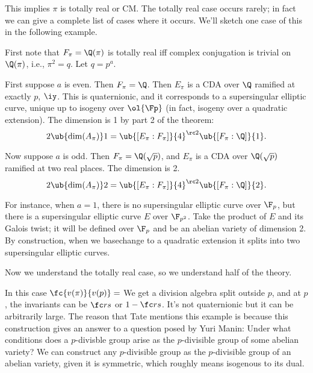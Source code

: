 This implies $\pi$ is totally real or CM. The totally real case occurs rarely; in fact we can give a complete list of cases where it occurs. We'll sketch one case of this in the following example.
\begin{ex}
First note that $F_{\pi}=\Q(\pi)$ is totally real iff complex conjugation is trivial on $\Q(\pi)$, i.e., $\pi^2=q$. Let $q=p^a$.

First suppose $a$ is even. Then $F_{\pi}=\Q$. %
Then $E_{\pi}$ is a CDA over $\Q$ ramified at exactly $p$, $\iy$. This is quaternionic, and it corresponds to a supersingular elliptic curve, unique up to isogeny over $\ol{\Fp}$ (in fact, isogeny over a quadratic extension). The dimension is 1 by part 2 of the theorem: %
\[
2\ub{\dim(A_{\pi})}1={\ub{[E_{\pi}:F_{\pi}]}{4}}^{\rc2}\ub{[F_{\pi}:\Q]}{1}.
\]

Now suppose $a$ is odd. %
Then $F_{\pi}=\Q(\sqrt p)$, and $E_{\pi}$ is a CDA over $\Q(\sqrt{p})$ ramified at two real places. 
The dimension is 2.
\[
2\ub{\dim(A_{\pi})}2={\ub{[E_{\pi}:F_{\pi}]}{4}}^{\rc2}\ub{[F_{\pi}:\Q]}{2}.
\]

For instance, when $a=1$, there is no supersingular elliptic curve over $\F_p$, but there is a supersingular elliptic curve $E$ over $\F_{p^2}$. Take the product of $E$ and its Galois twist; it will be defined over $\F_p$ and be an abelian variety of dimension 2. By construction, when we basechange to a quadratic extension it splits into two supersingular elliptic curves.
\end{ex}
Now we understand the totally real case, so we understand half of the theory.\\

\vskip0.15in

In this case $\fc{v(\pi)}{v(p)}=$ We get a division algebra split outside $p$, and at $p$, the invariants can be $\fc rs$ or $1-\fc rs$. It's not quaternionic but it can be arbitrarily large. The reason that Tate mentions this example is because this construction gives an answer to a question posed by Yuri Manin: Under what conditions does a $p$-divisble group arise as the $p$-divisible group of some abelian variety? We can construct any $p$-divisible group as the $p$-divisible group of an  abelian variety, given it is symmetric, which roughly means  isogenous to its dual.

